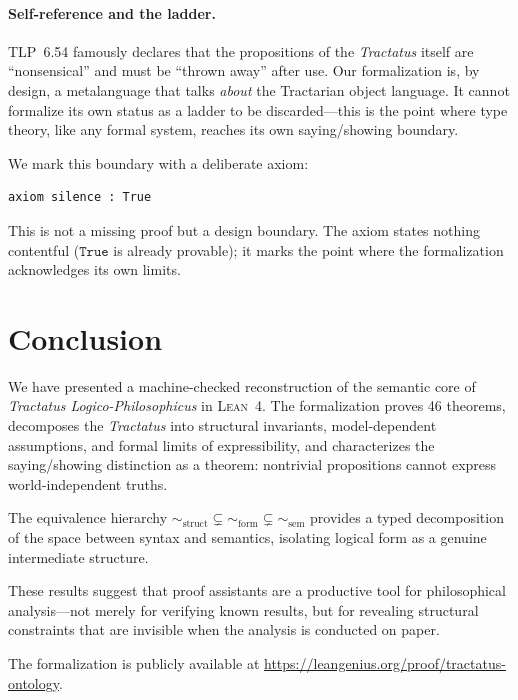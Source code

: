 \documentclass[10pt, letterpaper]{article}
\theoremstyle{definition}
\theoremstyle{remark}
\newcommand{\structEq}{\sim_{\mathrm{struct}}}
\newcommand{\formEq}{\sim_{\mathrm{form}}}
\newcommand{\semEq}{\sim_{\mathrm{sem}}}
\newcommand{\Lean}{\textsc{Lean}}
\begin{document}
\paragraph{Self-reference and the ladder.}
TLP~6.54 famously declares that the propositions of the
\emph{Tractatus} itself are ``nonsensical'' and must be ``thrown
away'' after use.  Our formalization is, by design, a
metalanguage that talks \emph{about} the Tractarian object
language.  It cannot formalize its own status as a ladder to be
discarded---this is the point where type theory, like any formal
system, reaches its own saying/showing boundary.

We mark this boundary with a deliberate axiom:

\begin{lstlisting}
axiom silence : True
\end{lstlisting}

\noindent
This is not a missing proof but a design boundary.  The axiom
states nothing contentful ($\mathtt{True}$ is already provable);
it marks the point where the formalization acknowledges its own
limits.

\section{Conclusion}
\label{sec:conclusion}

We have presented a machine-checked reconstruction of the
semantic core of \emph{Tractatus Logico-Philosophicus} in
\Lean~4.  The formalization proves 46 theorems, decomposes the
\emph{Tractatus} into structural invariants, model-dependent
assumptions, and formal limits of expressibility, and
characterizes the saying/showing distinction as a theorem:
nontrivial propositions cannot express world-independent truths.

The equivalence hierarchy $\structEq \subsetneq \formEq
\subsetneq \semEq$ provides a typed decomposition of the space
between syntax and semantics, isolating logical form as a
genuine intermediate structure.

These results suggest that proof assistants are a productive tool
for philosophical analysis---not merely for verifying known
results, but for revealing structural constraints that are
invisible when the analysis is conducted on paper.

The formalization is publicly available at
\url{https://leangenius.org/proof/tractatus-ontology}.
\end{document}
